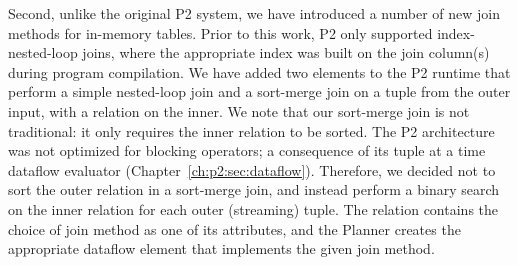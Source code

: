 Second, unlike the original P2 system, we have introduced a number of new join
methods for in-memory tables.  Prior to this work, P2 only supported
index-nested-loop joins, where the appropriate index was built on the join
column(s) during program compilation.  We have added two elements to the P2
runtime that perform a simple nested-loop join and a sort-merge join on a tuple
from the outer input, with a relation on the inner.  We note that our
sort-merge join is not traditional: it only requires the inner relation to be
sorted.  The P2 architecture was not optimized for blocking operators; a
consequence of its tuple at a time dataflow evaluator
(Chapter~\ref{ch:p2:sec:dataflow}).  Therefore, we decided not to sort the
outer relation in a sort-merge join, and instead perform a binary search on the
inner relation for each outer (streaming) tuple.  The  relation
contains the choice of join method as one of its attributes, and the Planner
creates the appropriate dataflow element that implements the given join method.


